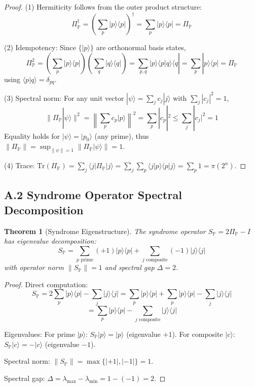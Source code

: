 \documentclass[11pt,letterpaper]{article}
\newtheorem{theorem}{Theorem}
\begin{document}
\begin{proof}
(1) Hermiticity follows from the outer product structure:
\[
\Pi_{\mathbb{P}}^\dagger = \left(\sum_p |p\rangle\langle p|\right)^\dagger = \sum_p |p\rangle\langle p| = \Pi_{\mathbb{P}}
\]

(2) Idempotency: Since $\{|p\rangle\}$ are orthonormal basis states,
\[
\Pi_{\mathbb{P}}^2 = \left(\sum_p |p\rangle\langle p|\right)\left(\sum_q |q\rangle\langle q|\right) = \sum_{p,q} |p\rangle\langle p|q\rangle\langle q| = \sum_p |p\rangle\langle p| = \Pi_{\mathbb{P}}
\]
using $\langle p|q\rangle = \delta_{pq}$.

(3) Spectral norm: For any unit vector $|\psi\rangle = \sum_j c_j|j\rangle$ with $\sum_j |c_j|^2 = 1$,
\[
\|\Pi_{\mathbb{P}}|\psi\rangle\|^2 = \left\|\sum_p c_p|p\rangle\right\|^2 = \sum_p |c_p|^2 \leq \sum_j |c_j|^2 = 1
\]
Equality holds for $|\psi\rangle = |p_0\rangle$ (any prime), thus $\|\Pi_{\mathbb{P}}\| = \sup_{\|\psi\|=1} \|\Pi_{\mathbb{P}}|\psi\rangle\| = 1$.

(4) Trace: $\text{Tr}(\Pi_{\mathbb{P}}) = \sum_j \langle j|\Pi_{\mathbb{P}}|j\rangle = \sum_j \sum_p \langle j|p\rangle\langle p|j\rangle = \sum_p 1 = \pi(2^n)$.
\end{proof}

\subsection{A.2 Syndrome Operator Spectral Decomposition}

\begin{theorem}[Syndrome Eigenstructure]
The syndrome operator $S_{\mathbb{P}} = 2\Pi_{\mathbb{P}} - I$ has eigenvalue decomposition:
\[
S_{\mathbb{P}} = \sum_{p \text{ prime}} (+1)|p\rangle\langle p| + \sum_{j \text{ composite}} (-1)|j\rangle\langle j|
\]
with operator norm $\|S_{\mathbb{P}}\| = 1$ and spectral gap $\Delta = 2$.
\end{theorem}

\begin{proof}
Direct computation:
\[
S_{\mathbb{P}} = 2\sum_p |p\rangle\langle p| - \sum_j |j\rangle\langle j| = \sum_p |p\rangle\langle p| + \sum_p |p\rangle\langle p| - \sum_j |j\rangle\langle j|
\]
\[
= \sum_p |p\rangle\langle p| - \sum_{j \text{ composite}} |j\rangle\langle j|
\]

Eigenvalues: For prime $|p\rangle$: $S_{\mathbb{P}}|p\rangle = |p\rangle$ (eigenvalue $+1$). For composite $|c\rangle$: $S_{\mathbb{P}}|c\rangle = -|c\rangle$ (eigenvalue $-1$).

Spectral norm: $\|S_{\mathbb{P}}\| = \max\{|+1|, |-1|\} = 1$.

Spectral gap: $\Delta = \lambda_{\max} - \lambda_{\min} = 1 - (-1) = 2$.
\end{proof}
\end{document}

